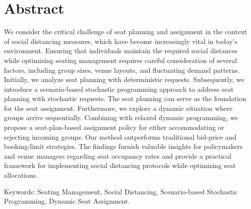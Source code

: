 
\section*{Abstract}
We consider the critical challenge of seat planning and assignment in the context of social distancing measures, which have become increasingly vital in today's environment. Ensuring that individuals maintain the required social distances while optimizing seating management requires careful consideration of several factors, including group sizes, venue layouts, and fluctuating demand patterns. Initially, we analyze seat planning with deterministic requests. Subsequently, we introduce a scenario-based stochastic programming approach to address seat planning with stochastic requests. The seat planning can serve as the foundation for the seat assignment. Furthermore, we explore a dynamic situation where groups arrive sequentially. Combining with relaxed dynamic programming, we propose a seat-plan-based assignment policy for either accommodating or rejecting incoming groups. Our method outperforms traditional bid-price and booking-limit strategies. The findings furnish valuable insights for policymakers and venue managers regarding seat occupancy rates and provide a practical framework for implementing social distancing protocols while optimizing seat allocations.



Keywords: Seating Management, Social Distancing, Scenario-based Stochastic Programming, Dynamic Seat Assignment.

